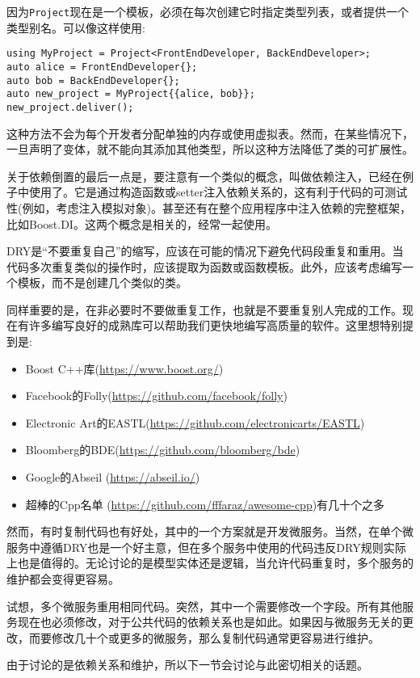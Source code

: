 因为\texttt{Project}现在是一个模板，必须在每次创建它时指定类型列表，或者提供一个类型别名。可以像这样使用:

\begin{lstlisting}[style=styleCXX]
using MyProject = Project<FrontEndDeveloper, BackEndDeveloper>;
auto alice = FrontEndDeveloper{};
auto bob = BackEndDeveloper{};
auto new_project = MyProject{{alice, bob}};
new_project.deliver();
\end{lstlisting}

这种方法不会为每个开发者分配单独的内存或使用虚拟表。然而，在某些情况下，一旦声明了变体，就不能向其添加其他类型，所以这种方法降低了类的可扩展性。

关于依赖倒置的最后一点是，要注意有一个类似的概念，叫做依赖注入，已经在例子中使用了。它是通过构造函数或setter注入依赖关系的，这有利于代码的可测试性(例如，考虑注入模拟对象)。甚至还有在整个应用程序中注入依赖的完整框架，比如Boost.DI。这两个概念是相关的，经常一起使用。


DRY是“不要重复自己”的缩写，应该在可能的情况下避免代码段重复和重用。当代码多次重复类似的操作时，应该提取为函数或函数模板。此外，应该考虑编写一个模板，而不是创建几个类似的类。

同样重要的是，在非必要时不要做重复工作，也就是不要重复别人完成的工作。现在有许多编写良好的成熟库可以帮助我们更快地编写高质量的软件。这里想特别提到是:


\begin{itemize}
\item Boost C++库(\url{https://www.boost.org/})
\item Facebook的Folly(\url{https://github.com/facebook/folly})
\item Electronic Art的EASTL(\url{https://github.com/electronicarts/EASTL})
\item Bloomberg的BDE(\url{https://github.com/bloomberg/bde})
\item Google的Abseil (\url{https://abseil.io/})
\item 超棒的Cpp名单 (\url{https://github.com/fffaraz/awesome-cpp})有几十个之多

\end{itemize}

然而，有时复制代码也有好处，其中的一个方案就是开发微服务。当然，在单个微服务中遵循DRY也是一个好主意，但在多个服务中使用的代码违反DRY规则实际上也是值得的。无论讨论的是模型实体还是逻辑，当允许代码重复时，多个服务的维护都会变得更容易。

试想，多个微服务重用相同代码。突然，其中一个需要修改一个字段。所有其他服务现在也必须修改，对于公共代码的依赖关系也是如此。如果因与微服务无关的更改，而要修改几十个或更多的微服务，那么复制代码通常更容易进行维护。

由于讨论的是依赖关系和维护，所以下一节会讨论与此密切相关的话题。








